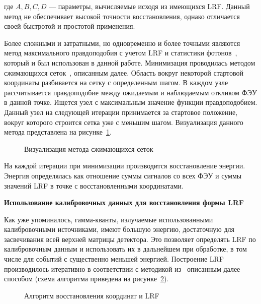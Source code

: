 где $A, B, C, D$ --- параметры, вычисляемые исходя из имеющихся LRF. Данный метод не обеспечивает высокой точности восстановления, однако отличается своей быстротой и простотой применения.
\par Более сложными и затратными, но одновременно и более точными являются метод максимального правдоподобия с учетом LRF и статистики фотонов~\cite{6154607}, который и был использован в данной работе. Минимизация проводилась методом сжимающихся сеток~\cite{grids}, описанным далее. Область вокруг некоторой стартовой координаты разбивается на сетку с определенным шагом. В каждом узле рассчитывается правдоподобие между ожидаемым и наблюдаемым откликом ФЭУ в данной точке. Ищется узел с максимальным значение функции правдоподобием. Данный узел на следующей итерации принимается за стартовое положение, вокруг которого строится сетка уже с меньшим шагом. 
Визуализация данного метода представлена на рисунке~\ref{ris:grids}.
\begin{figure}[hbt]
	\caption{Визуализация метода сжимающихся сеток}
	\label{ris:grids}
\end{figure}
На каждой итерации при минимизации производится восстановление энергии. Энергия определялась как отношение суммы сигналов со всех ФЭУ и суммы значений LRF в точке с восстановленными координатами.
\\
\par\textbf{Использование калибровочных данных для восстановления формы LRF}
\par
Как уже упоминалось, гамма-кванты, излучаемые использованными калибровочными источниками, имеют большую энергию, достаточную для засвечивания всей верхней матрицы детектора. Это позволяет определять LRF по калибровочным данным и использовать их в дальнейшем при обработке,  в том числе для событий с существенно меньшей энергией. Построение LRF производилось итеративно в соответствии с методикой из~\cite{6154607}  описанным далее способом (схема алгоритма приведена на рисунке~\ref{ris:lrfscheme}). 
\begin{figure}[hbt]
	\caption{Алгоритм восстановления координат и LRF}
	\label{ris:lrfscheme}
\end{figure}
